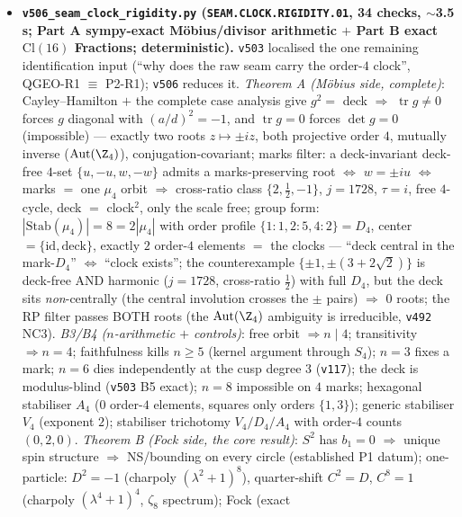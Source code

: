 \documentclass[11pt]{article}
\begin{document}
\begin{itemize}[leftmargin=1.5em]
\item \textbf{\texttt{v506\_seam\_clock\_rigidity.py} (\texttt{SEAM.CLOCK.RIGIDITY.01}, 34 checks,
$\sim$3.5 s; Part A sympy-exact M\"obius/divisor arithmetic $+$ Part B exact $\mathrm{Cl}(16)$
Fractions; deterministic).} \texttt{v503} localised the one remaining identification input (``why
does the raw seam carry the order-$4$ clock'', QGEO-R1 $\equiv$ P2-R1); \texttt{v506} reduces it.
\emph{Theorem A (M\"obius side, complete)}: Cayley--Hamilton $+$ the complete case analysis give
$g^2=$ deck $\Rightarrow$ $\operatorname{tr}g\neq0$ forces $g$ diagonal with $(a/d)^2=-1$, and
$\operatorname{tr}g=0$ forces $\det g=0$ (impossible) --- exactly two roots $z\mapsto\pm iz$, both
projective order $4$, mutually inverse ($\operatorname{Aut}(\Z_4)$), conjugation-covariant;
marks filter: a deck-invariant deck-free $4$-set $\{u,-u,w,-w\}$ admits a marks-preserving root
$\iff$ $w=\pm iu$ $\iff$ marks $=$ one $\mu_4$ orbit $\Rightarrow$ cross-ratio class
$\{2,\tfrac12,-1\}$, $j=1728$, $\tau=i$, free $4$-cycle, deck $=$ clock$^2$, only the scale free;
group form: $|\mathrm{Stab}(\mu_4)|=8=2|\mu_4|$ with order profile $\{1{:}1,2{:}5,4{:}2\}=D_4$,
center $=\{\mathrm{id},\text{deck}\}$, exactly $2$ order-$4$ elements $=$ the clocks --- ``deck
central in the mark-$D_4$'' $\iff$ ``clock exists''; the counterexample $\{\pm1,\pm(3{+}2\sqrt2)\}$
is deck-free AND harmonic ($j=1728$, cross-ratio $\tfrac12$) with full $D_4$, but the deck sits
\emph{non}-centrally (the central involution crosses the $\pm$ pairs) $\Rightarrow$ $0$ roots; the
RP filter passes BOTH roots (the $\operatorname{Aut}(\Z_4)$ ambiguity is irreducible, \texttt{v492}
NC3). \emph{B3/B4 ($n$-arithmetic $+$ controls)}: free orbit $\Rightarrow n\mid4$; transitivity
$\Rightarrow n=4$; faithfulness kills $n\ge5$ (kernel argument through $S_4$); $n=3$ fixes a mark;
$n=6$ dies independently at the cusp degree $3$ (\texttt{v117}); the deck is modulus-blind
(\texttt{v503} B5 exact); $n=8$ impossible on $4$ marks; hexagonal stabiliser $A_4$ ($0$ order-$4$
elements, squares only orders $\{1,3\}$); generic stabiliser $V_4$ (exponent $2$); stabiliser
trichotomy $V_4/D_4/A_4$ with order-$4$ counts $(0,2,0)$. \emph{Theorem B (Fock side, the core
result)}: $S^2$ has $b_1=0$ $\Rightarrow$ unique spin structure $\Rightarrow$ NS/bounding on every
circle (established P1 datum); one-particle: $D^2=-1$ (charpoly $(\lambda^2{+}1)^8$), quarter-shift
$C^2=D$, $C^8=1$ (charpoly $(\lambda^4{+}1)^4$, $\zeta_8$ spectrum); Fock (exact

\end{itemize}
\end{document}
